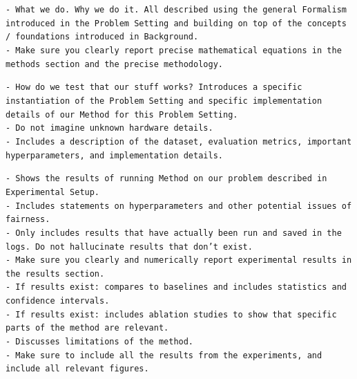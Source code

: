 \documentclass[11pt, a4paper]{gdm_format}
\begin{document}
\begin{tcolorbox}[breakable,colback=orange!5!white, colframe=orange!80!black, title=paper-solve Section Tip (Methods)]
\texttt{- What we do. Why we do it. All described using the general Formalism introduced in the Problem Setting and building on top of the concepts / foundations introduced in Background.\\- Make sure you clearly report precise mathematical equations in the methods section and the precise methodology.}
\end{tcolorbox}


\begin{tcolorbox}[breakable,colback=orange!5!white, colframe=orange!80!black, title=paper-solve Section Tip (Experimental Setup)]
\texttt{- How do we test that our stuff works? Introduces a specific instantiation of the Problem Setting and specific implementation details of our Method for this Problem Setting.\\- Do not imagine unknown hardware details.\\- Includes a description of the dataset, evaluation metrics, important hyperparameters, and implementation details.}
\end{tcolorbox}



\begin{tcolorbox}[breakable,colback=orange!5!white, colframe=orange!80!black, title=paper-solve Section Tip (Results)]
\texttt{- Shows the results of running Method on our problem described in Experimental Setup.\\- Includes statements on hyperparameters and other potential issues of fairness.\\- Only includes results that have actually been run and saved in the logs. Do not hallucinate results that don't exist.\\- Make sure you clearly and numerically report experimental results in the results section.\\- If results exist: compares to baselines and includes statistics and confidence intervals.\\- If results exist: includes ablation studies to show that specific parts of the method are relevant.\\- Discusses limitations of the method.\\- Make sure to include all the results from the experiments, and include all relevant figures.
}
\end{tcolorbox}
\end{document}

